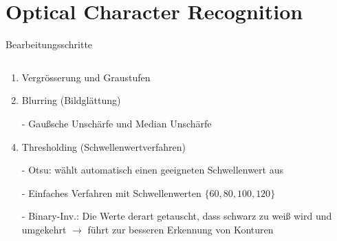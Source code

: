 \section{Optical Character Recognition}

\begin{frame}{Bearbeitungsschritte}
    \begin{columns}
        \begin{column}{0.6\textwidth}
            \begin{enumerate}
                \item {\small Vergr\"osserung und Graustufen}
                \item {\small Blurring (Bildgl\"attung)}
                \item[-] {\scriptsize Gaußsche Unsch\"arfe und Median Unsch\"arfe}
                \item {\small Thresholding (Schwellenwertverfahren)}

                \item[-] {\scriptsize Otsu: w\"ahlt automatisch einen geeigneten Schwellenwert aus}
                \item[-] {\scriptsize Einfaches Verfahren mit Schwellenwerten $\{60,80,100,120\}$}
                \item[-] {\scriptsize Binary-Inv.: Die Werte derart getauscht, dass schwarz zu weiß wird und umgekehrt $\rightarrow$ führt zur besseren Erkennung von Konturen}


\end{enumerate}
\end{column}
\end{columns}
\end{frame}
